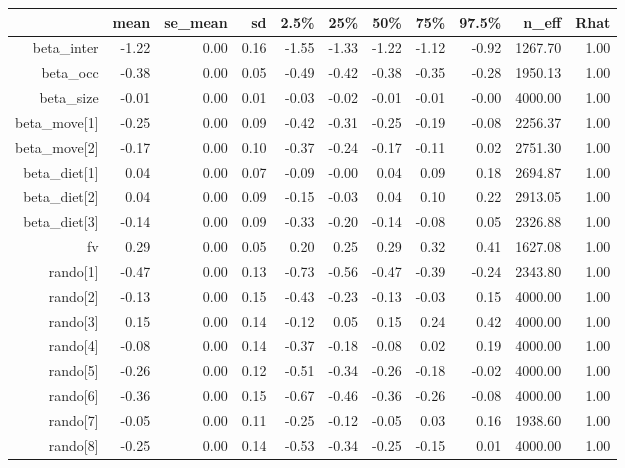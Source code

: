 \begin{table}[ht]
\centering
\begin{tabular}{rrrrrrrrrrr}
  \hline
 & mean & se\_mean & sd & 2.5\% & 25\% & 50\% & 75\% & 97.5\% & n\_eff & Rhat \\ 
  \hline
beta\_inter & -1.22 & 0.00 & 0.16 & -1.55 & -1.33 & -1.22 & -1.12 & -0.92 & 1267.70 & 1.00 \\ 
  beta\_occ & -0.38 & 0.00 & 0.05 & -0.49 & -0.42 & -0.38 & -0.35 & -0.28 & 1950.13 & 1.00 \\ 
  beta\_size & -0.01 & 0.00 & 0.01 & -0.03 & -0.02 & -0.01 & -0.01 & -0.00 & 4000.00 & 1.00 \\ 
  beta\_move[1] & -0.25 & 0.00 & 0.09 & -0.42 & -0.31 & -0.25 & -0.19 & -0.08 & 2256.37 & 1.00 \\ 
  beta\_move[2] & -0.17 & 0.00 & 0.10 & -0.37 & -0.24 & -0.17 & -0.11 & 0.02 & 2751.30 & 1.00 \\ 
  beta\_diet[1] & 0.04 & 0.00 & 0.07 & -0.09 & -0.00 & 0.04 & 0.09 & 0.18 & 2694.87 & 1.00 \\ 
  beta\_diet[2] & 0.04 & 0.00 & 0.09 & -0.15 & -0.03 & 0.04 & 0.10 & 0.22 & 2913.05 & 1.00 \\ 
  beta\_diet[3] & -0.14 & 0.00 & 0.09 & -0.33 & -0.20 & -0.14 & -0.08 & 0.05 & 2326.88 & 1.00 \\ 
  fv & 0.29 & 0.00 & 0.05 & 0.20 & 0.25 & 0.29 & 0.32 & 0.41 & 1627.08 & 1.00 \\ 
  rando[1] & -0.47 & 0.00 & 0.13 & -0.73 & -0.56 & -0.47 & -0.39 & -0.24 & 2343.80 & 1.00 \\ 
  rando[2] & -0.13 & 0.00 & 0.15 & -0.43 & -0.23 & -0.13 & -0.03 & 0.15 & 4000.00 & 1.00 \\ 
  rando[3] & 0.15 & 0.00 & 0.14 & -0.12 & 0.05 & 0.15 & 0.24 & 0.42 & 4000.00 & 1.00 \\ 
  rando[4] & -0.08 & 0.00 & 0.14 & -0.37 & -0.18 & -0.08 & 0.02 & 0.19 & 4000.00 & 1.00 \\ 
  rando[5] & -0.26 & 0.00 & 0.12 & -0.51 & -0.34 & -0.26 & -0.18 & -0.02 & 4000.00 & 1.00 \\ 
  rando[6] & -0.36 & 0.00 & 0.15 & -0.67 & -0.46 & -0.36 & -0.26 & -0.08 & 4000.00 & 1.00 \\ 
  rando[7] & -0.05 & 0.00 & 0.11 & -0.25 & -0.12 & -0.05 & 0.03 & 0.16 & 1938.60 & 1.00 \\ 
  rando[8] & -0.25 & 0.00 & 0.14 & -0.53 & -0.34 & -0.25 & -0.15 & 0.01 & 4000.00 & 1.00 \\ 

\end{tabular}
\end{table}
